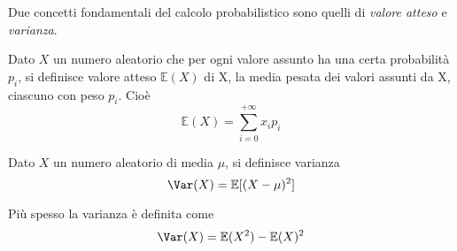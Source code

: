 \documentclass{subfiles}
\begin{document}
Due concetti fondamentali del calcolo probabilistico sono quelli di \emph{valore atteso} e \emph{varianza}.
\begin{Definition*}
    Dato \(X\) un numero aleatorio che per ogni valore assunto ha una certa probabilità \(p_{i}\), si definisce valore atteso \(\mathbb{E}(X)\) di X, la media pesata dei valori assunti da X,
    ciascuno con peso \(p_{i}\). Cioè
    \[
        \mathbb{E}(X) = \sum\limits_{i = 0}^{+ \infty}{x_{i}}{p_{i}}
    \]
\end{Definition*}

\begin{Definition*}
    Dato \(X\) un numero aleatorio di media \(\mu\), si definisce varianza
    \[\Var(X) = \mathbb{E}[(X - \mu)^{2}]\]
\end{Definition*}
Più spesso la varianza è definita come
\[
    \Var(X) = \mathbb{E}(X^{2}) - \mathbb{E}(X)^{2}
\]
\end{document}
